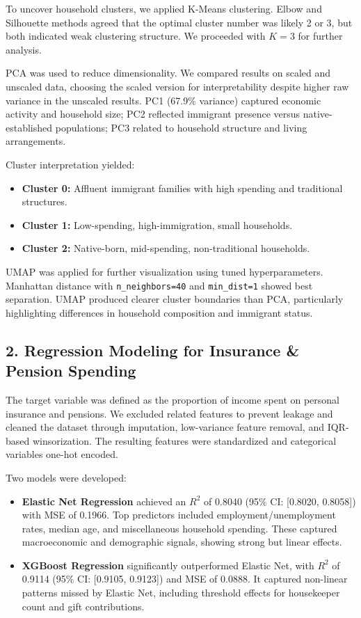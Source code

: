 \documentclass{article}
\begin{document}
To uncover household clusters, we applied K-Means clustering. Elbow and Silhouette methods agreed that the optimal cluster number was likely 2 or 3, but both indicated weak clustering structure. We proceeded with $K = 3$ for further analysis.

PCA was used to reduce dimensionality. We compared results on scaled and unscaled data, choosing the scaled version for interpretability despite higher raw variance in the unscaled results. PC1 (67.9\% variance) captured economic activity and household size; PC2 reflected immigrant presence versus native-established populations; PC3 related to household structure and living arrangements.

Cluster interpretation yielded:
\begin{itemize}
    \item \textbf{Cluster 0:} Affluent immigrant families with high spending and traditional structures.
    \item \textbf{Cluster 1:} Low-spending, high-immigration, small households.
    \item \textbf{Cluster 2:} Native-born, mid-spending, non-traditional households.
\end{itemize}

UMAP was applied for further visualization using tuned hyperparameters. Manhattan distance with \texttt{n\_neighbors=40} and \texttt{min\_dist=1} showed best separation. UMAP produced clearer cluster boundaries than PCA, particularly highlighting differences in household composition and immigrant status.

\subsection*{2. Regression Modeling for Insurance \& Pension Spending}

The target variable was defined as the proportion of income spent on personal insurance and pensions. We excluded related features to prevent leakage and cleaned the dataset through imputation, low-variance feature removal, and IQR-based winsorization. The resulting features were standardized and categorical variables one-hot encoded.

Two models were developed:
\begin{itemize}
    \item \textbf{Elastic Net Regression} achieved an $R^2$ of 0.8040 (95\% CI: [0.8020, 0.8058]) with MSE of 0.1966. Top predictors included employment/unemployment rates, median age, and miscellaneous household spending. These captured macroeconomic and demographic signals, showing strong but linear effects.
    \item \textbf{XGBoost Regression} significantly outperformed Elastic Net, with $R^2$ of 0.9114 (95\% CI: [0.9105, 0.9123]) and MSE of 0.0888. It captured non-linear patterns missed by Elastic Net, including threshold effects for housekeeper count and gift contributions.
\end{itemize}
\end{document}

